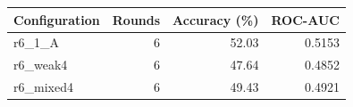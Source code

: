 \begin{tabular}{lrrr}
Configuration & Rounds & Accuracy (\%) & ROC-AUC \\
\hline
r6\_1\_A & 6 & 52.03 & 0.5153 \\
r6\_weak4 & 6 & 47.64 & 0.4852 \\
r6\_mixed4 & 6 & 49.43 & 0.4921 \\
\end{tabular}

